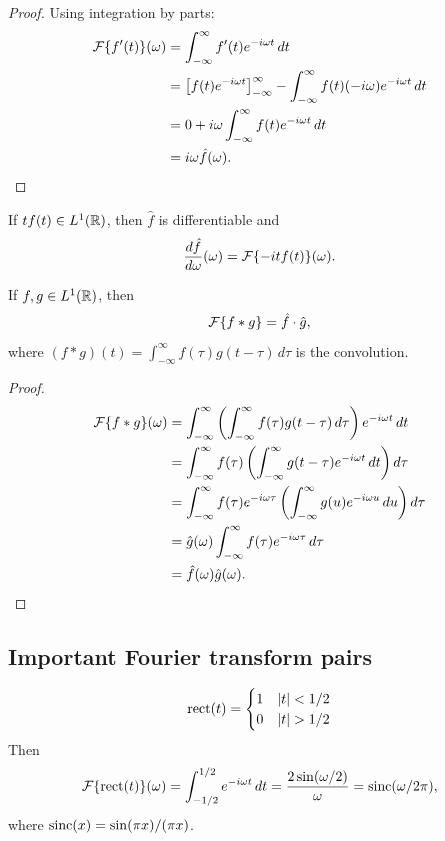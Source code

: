 \begin{notechapter}
\begin{proof}
Using integration by parts:
\begin{align*}
\mathcal{F}\{f'(t)\}(\omega) &= \int_{-\infty}^{\infty} f'(t) e^{-i\omega t} \, dt \\
&= \left[ f(t) e^{-i\omega t} \right]_{-\infty}^{\infty} - \int_{-\infty}^{\infty} f(t) (-i\omega) e^{-i\omega t} \, dt \\
&= 0 + i\omega \int_{-\infty}^{\infty} f(t) e^{-i\omega t} \, dt \\
&= i\omega \hat{f}(\omega).
\end{align*}
\end{proof}

\begin{proposition}
If $tf(t) \in L^1(\mathbb{R})$, then $\hat{f}$ is differentiable and
\[
\frac{d\hat{f}}{d\omega}(\omega) = \mathcal{F}\{-it f(t)\}(\omega).
\]
\end{proposition}

\begin{proposition}
If $f, g \in L^1(\mathbb{R})$, then
\[
\mathcal{F}\{f * g\} = \hat{f} \cdot \hat{g},
\]
where $(f * g)(t) = \int_{-\infty}^{\infty} f(\tau) g(t - \tau) \, d\tau$ is the convolution.
\end{proposition}

\begin{proof}
\begin{align*}
\mathcal{F}\{f * g\}(\omega) &= \int_{-\infty}^{\infty} \left( \int_{-\infty}^{\infty} f(\tau) g(t - \tau) \, d\tau \right) e^{-i\omega t} \, dt \\
&= \int_{-\infty}^{\infty} f(\tau) \left( \int_{-\infty}^{\infty} g(t - \tau) e^{-i\omega t} \, dt \right) d\tau \\
&= \int_{-\infty}^{\infty} f(\tau) e^{-i\omega \tau} \left( \int_{-\infty}^{\infty} g(u) e^{-i\omega u} \, du \right) d\tau \\
&= \hat{g}(\omega) \int_{-\infty}^{\infty} f(\tau) e^{-i\omega \tau} \, d\tau \\
&= \hat{f}(\omega) \hat{g}(\omega).
\end{align*}
\end{proof}

\subsection{Important Fourier transform pairs}

\begin{example}
\[
\operatorname{rect}(t) = \begin{cases}
1 & \left|t\right| < 1/2 \\
0 & \left|t\right| > 1/2
\end{cases}
\]
Then
\[
\mathcal{F}\{\operatorname{rect}(t)\}(\omega) = \int_{-1/2}^{1/2} e^{-i\omega t} \, dt = \frac{2\sin(\omega/2)}{\omega} = \operatorname{sinc}(\omega/2\pi),
\]
where $\operatorname{sinc}(x) = \sin(\pi x)/(\pi x)$.
\end{example}


\end{notechapter}
